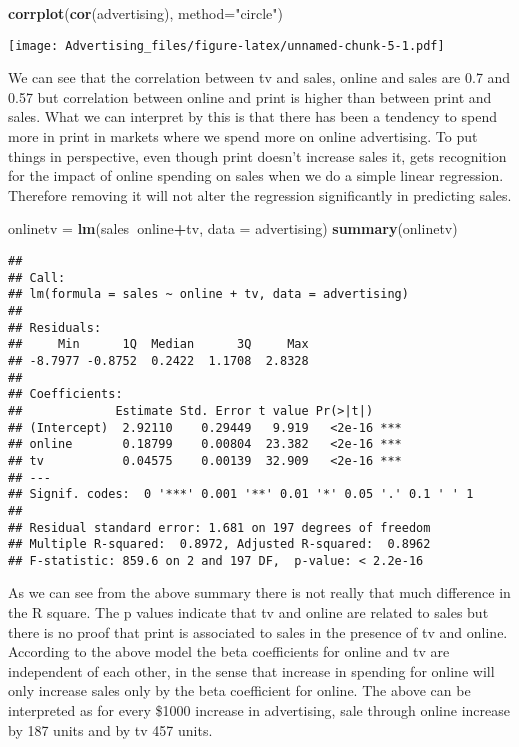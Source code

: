 \documentclass[
]{article}
\newenvironment{Shaded}{\begin{snugshade}}{\end{snugshade}}
\newcommand{\DataTypeTok}[1]{\textcolor[rgb]{0.13,0.29,0.53}{#1}}
\newcommand{\KeywordTok}[1]{\textcolor[rgb]{0.13,0.29,0.53}{\textbf{#1}}}
\newcommand{\NormalTok}[1]{#1}
\newcommand{\OperatorTok}[1]{\textcolor[rgb]{0.81,0.36,0.00}{\textbf{#1}}}
\newcommand{\StringTok}[1]{\textcolor[rgb]{0.31,0.60,0.02}{#1}}
\begin{document}
\begin{Shaded}
\begin{Highlighting}[]
\KeywordTok{corrplot}\NormalTok{(}\KeywordTok{cor}\NormalTok{(advertising), }\DataTypeTok{method=}\StringTok{"circle"}\NormalTok{)}
\end{Highlighting}
\end{Shaded}

\texttt{[image: Advertising\_files/figure-latex/unnamed-chunk-5-1.pdf]}

We can see that the correlation between tv and sales, online and sales
are 0.7 and 0.57 but correlation between online and print is higher than
between print and sales. What we can interpret by this is that there has
been a tendency to spend more in print in markets where we spend more on
online advertising. To put things in perspective, even though print
doesn't increase sales it, gets recognition for the impact of online
spending on sales when we do a simple linear regression. Therefore
removing it will not alter the regression significantly in predicting
sales.

\begin{Shaded}
\begin{Highlighting}[]
\NormalTok{onlinetv =}\StringTok{ }\KeywordTok{lm}\NormalTok{(sales}\OperatorTok{~}\NormalTok{online}\OperatorTok{+}\NormalTok{tv, }\DataTypeTok{data =}\NormalTok{ advertising)}
\KeywordTok{summary}\NormalTok{(onlinetv)}
\end{Highlighting}
\end{Shaded}

\begin{verbatim}
## 
## Call:
## lm(formula = sales ~ online + tv, data = advertising)
## 
## Residuals:
##     Min      1Q  Median      3Q     Max 
## -8.7977 -0.8752  0.2422  1.1708  2.8328 
## 
## Coefficients:
##             Estimate Std. Error t value Pr(>|t|)    
## (Intercept)  2.92110    0.29449   9.919   <2e-16 ***
## online       0.18799    0.00804  23.382   <2e-16 ***
## tv           0.04575    0.00139  32.909   <2e-16 ***
## ---
## Signif. codes:  0 '***' 0.001 '**' 0.01 '*' 0.05 '.' 0.1 ' ' 1
## 
## Residual standard error: 1.681 on 197 degrees of freedom
## Multiple R-squared:  0.8972, Adjusted R-squared:  0.8962 
## F-statistic: 859.6 on 2 and 197 DF,  p-value: < 2.2e-16
\end{verbatim}

As we can see from the above summary there is not really that much
difference in the R square. The p values indicate that tv and online are
related to sales but there is no proof that print is associated to sales
in the presence of tv and online. According to the above model the beta
coefficients for online and tv are independent of each other, in the
sense that increase in spending for online will only increase sales only
by the beta coefficient for online. The above can be interpreted as for
every \$1000 increase in advertising, sale through online increase by
187 units and by tv 457 units.
\end{document}
